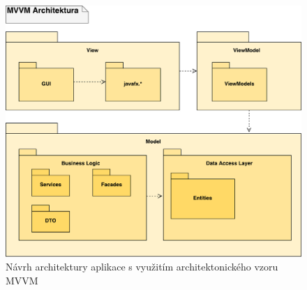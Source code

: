 \newpage
\begin{figure}[h!]
\begin{center}
\includegraphics[scale=0.75]{../02_Vysledne_modely/03_1_ProjectArchitecture.pdf}
\caption{Návrh architektury aplikace s využitím architektonického vzoru MVVM}
\label{fig:communication09-1}
\end{center}
\end{figure}

\newpage
\begin{landscape}   
\end{landscape}


